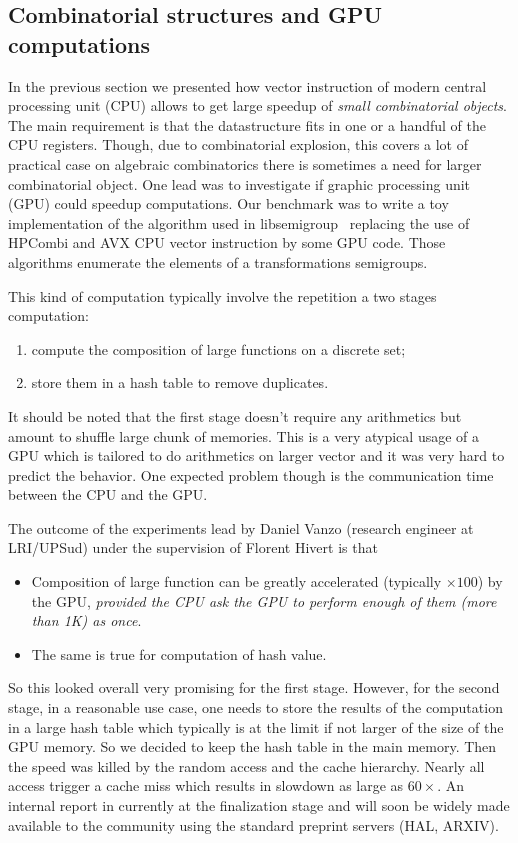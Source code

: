 \documentclass{deliverablereport}
\begin{document}
\subsection{Combinatorial structures and GPU computations}

In the previous section we presented how vector instruction of modern central
processing unit (CPU) allows to get large speedup of \emph{small combinatorial
  objects}. The main requirement is that the datastructure fits in one or a
handful of the CPU registers. Though, due to combinatorial explosion, this
covers a lot of practical case on algebraic combinatorics there is sometimes a
need for larger combinatorial object. One lead was to investigate if graphic
processing unit (GPU) could speedup computations. Our benchmark was to write a
toy implementation of the algorithm used in libsemigroup~\cite{libsemigroup}
replacing the use of HPCombi and AVX CPU vector instruction by some GPU
code. Those algorithms enumerate the elements of a transformations semigroups.

This kind of computation typically involve the repetition a two stages
computation:
\begin{enumerate}
\item compute the composition of large functions on a discrete set;
\item store them in a hash table to remove duplicates.
\end{enumerate}
It should be noted that the first stage doesn't require any arithmetics but
amount to shuffle large chunk of memories. This is a very atypical usage of a
GPU which is tailored to do arithmetics on larger vector and it was very hard
to predict the behavior. One expected problem though is the communication time
between the CPU and the GPU.
\medskip

The outcome of the experiments lead by Daniel Vanzo (research engineer at
LRI/UPSud) under the supervision of Florent Hivert is that
\begin{itemize}
\item Composition of large function can be greatly accelerated (typically
  $\times 100$) by the GPU, \emph{provided the CPU ask the GPU to perform
    enough of them (more than 1K) as once}.
\item The same is true for computation of hash value.
\end{itemize}
So this looked overall very promising for the first stage. However, for the
second stage, in a reasonable use case, one needs to store the results of the
computation in a large hash table which typically is at the limit if not
larger of the size of the GPU memory. So we decided to keep the hash table in
the main memory. Then the speed was killed by the random access and the cache
hierarchy. Nearly all access trigger a cache miss which results in slowdown as
large as $60\times$. An internal report in currently at the finalization stage
and will soon be widely made available to the community using the standard
preprint servers (HAL, ARXIV).
\bigskip
\end{document}
